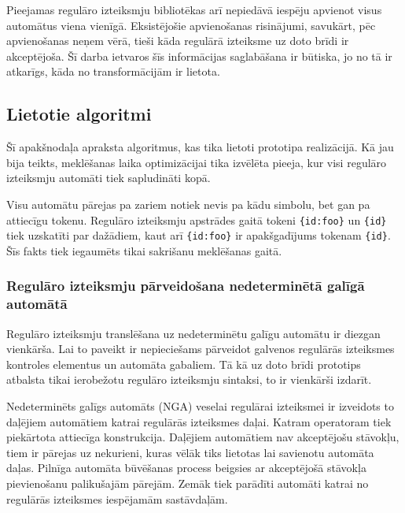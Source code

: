 Pieejamas regulāro izteiksmju bibliotēkas arī nepiedāvā iespēju apvienot visus automātus viena vienīgā. Eksistējošie apvienošanas risinājumi, savukārt, pēc apvienošanas neņem vērā, tieši kāda regulārā izteiksme uz doto brīdi ir akceptējoša. Šī darba ietvaros šīs informācijas saglabāšana ir būtiska, jo no tā ir atkarīgs, kāda no transformācijām ir lietota. 


\subsection{\label{sbs:prot_algorithms}Lietotie algoritmi}

Šī apakšnodaļa apraksta algoritmus, kas tika lietoti prototipa realizācijā. Kā jau bija teikts, meklēšanas laika optimizācijai tika izvēlēta pieeja, kur visi regulāro izteiksmju automāti tiek sapludināti kopā.

Visu automātu pārejas pa zariem notiek nevis pa kādu simbolu, bet gan pa attiecīgu tokenu. Regulāro izteiksmju apstrādes gaitā tokeni \verb|{id:foo}| un \verb|{id}| tiek uzskatīti par dažādiem, kaut arī \verb|{id:foo}| ir apakšgadījums tokenam \verb|{id}|. Šīs fakts tiek iegaumēts tikai sakrišanu meklēšanas gaitā.

\subsubsection{Regulāro izteiksmju pārveidošana nedeterminētā galīgā automātā}


Regulāro izteiksmju translēšana uz nedeterminētu galīgu automātu ir diezgan vienkārša. Lai to paveikt ir nepieciešams  pārveidot galvenos regulārās izteiksmes kontroles elementus un automāta gabaliem. Tā kā uz doto brīdi prototips atbalsta tikai ierobežotu regulāro izteiksmju sintaksi, to ir vienkārši izdarīt.

Nedeterminēts galīgs automāts (NGA) veselai regulārai izteiksmei ir izveidots to daļējiem automātiem katrai regulārās izteiksmes daļai. Katram operatoram tiek piekārtota attiecīga konstrukcija. Daļējiem automātiem nav akceptējošu stāvokļu, tiem ir pārejas uz nekurieni, kuras vēlāk tiks lietotas lai savienotu automāta daļas. Pilnīga automāta būvēšanas process beigsies ar akceptējošā stāvokļa pievienošanu palikušajām pārejām. Zemāk tiek parādīti automāti katrai no regulārās izteiksmes iespējamām sastāvdaļām.

